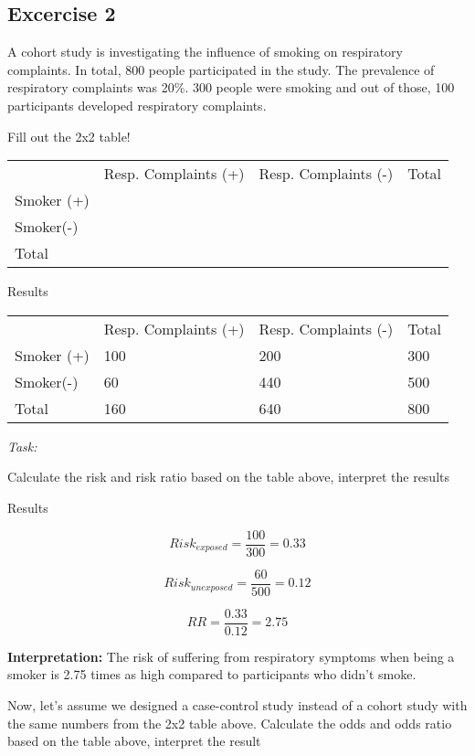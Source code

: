 \documentclass[
  letterpaper,
  paper=6in:9in,
  pagesize=pdftex,
  headinclude=on,
  footinclude=on,
  12pt]{scrbook}
\begin{document}
\hypertarget{excercise-2-1}{%
\subsection{Excercise 2}\label{excercise-2-1}}

A cohort study is investigating the influence of smoking on respiratory
complaints. In total, 800 people participated in the study. The
prevalence of respiratory complaints was 20\%. 300 people were smoking
and out of those, 100 participants developed respiratory complaints.

Fill out the 2x2 table!

\begin{longtable}[]{@{}llll@{}}
\toprule\noalign{}
\endhead
\bottomrule\noalign{}
\endlastfoot
& Resp. Complaints (+) & Resp. Complaints (-) & Total \\
Smoker (+) & & & \\
Smoker(-) & & & \\
Total & & & \\
\end{longtable}

Results

\begin{longtable}[]{@{}llll@{}}
\toprule\noalign{}
\endhead
\bottomrule\noalign{}
\endlastfoot
& Resp. Complaints (+) & Resp. Complaints (-) & Total \\
Smoker (+) & 100 & 200 & 300 \\
Smoker(-) & 60 & 440 & 500 \\
Total & 160 & 640 & 800 \\
\end{longtable}

\emph{Task:}

Calculate the risk and risk ratio based on the table above, interpret
the results

Results

\[
Risk_{exposed} = \frac{100}{300} = 0.33
\]

\[
Risk_{unexposed} = \frac{60}{500} = 0.12
\]

\[
RR = \frac{0.33}{0.12} = 2.75
\]

\textbf{Interpretation:} The risk of suffering from respiratory symptoms
when being a smoker is 2.75 times as high compared to participants who
didn't smoke.

Now, let's assume we designed a case-control study instead of a cohort
study with the same numbers from the 2x2 table above. Calculate the odds
and odds ratio based on the table above, interpret the result
\end{document}
